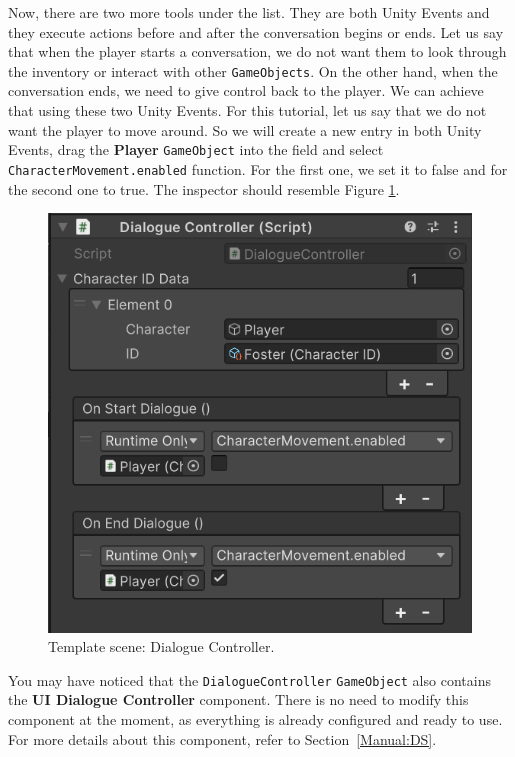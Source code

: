Now, there are two more tools under the list. They are both Unity Events and they execute actions before and after the conversation begins or ends. Let us say that when the player starts a conversation, we do not want them to look through the inventory or interact with other \texttt{GameObjects}. On the other hand, when the conversation ends, we need to give control back to the player. We can achieve that using these two Unity Events. For this tutorial, let us say that we do not want the player to move around. So we will create a new entry in both Unity Events, drag the \textbf{Player} \texttt{GameObject} into the field and select \texttt{CharacterMovement.enabled} function. For the first one, we set it to false and for the second one to true. The inspector should resemble Figure \ref{fig:Tutorial-template:DC}.

\begin{figure}[H]
\centering
\includegraphics[width=0.6\linewidth]{img/User doc/image_2025-07-09_104007947.png}
\caption{Template scene: Dialogue Controller.}
\label{fig:Tutorial-template:DC}
\end{figure}

You may have noticed that the \texttt{DialogueController} \texttt{GameObject} also contains the \textbf{UI Dialogue Controller} component. There is no need to modify this component at the moment, as everything is already configured and ready to use. For more details about this component, refer to Section~\ref{Manual:DS}.

